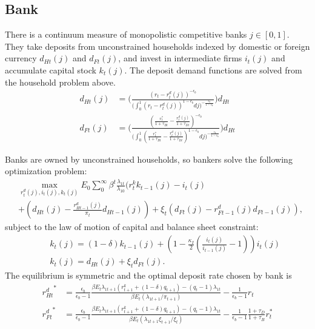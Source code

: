 \documentclass[12pt]{article}
\begin{document}
\subsection{Bank}
There is a continuum measure of monopolistic competitive banks $j \in [0,1]$. They take deposits from unconstrained households indexed by domestic or foreign currency $d_{Ht}(j)$ and $d_{Ft}(j)$, and invest in intermediate firms $i_t(j)$ and accumulate capital stock $k_t(j)$. The deposit demand functions are solved from the household problem above. 
\begin{align*}
d_{Ht}(j) &= \Biggl(\frac{(r_t-r_t^d(j))^{-\epsilon_b}}{\big(\int_0^1(r_t-r_t^d(j))^{1-\epsilon_b}dj\big)^{-\frac{\epsilon_b}{1-\epsilon_b}}}\Biggl)d_{Ht} \\
d_{Ft}(j) &= \Biggl(\frac{(\frac{r_t^*}{1+\tau_{Bt}}-\frac{r_t^d(j)}{1+\tau_{Dt}})^{-\epsilon_b}}{\big(\int_0^1(\frac{r_t^*}{1+\tau_{Bt}}-\frac{r_t^d(j)}{1+\tau_{Dt}})^{1-\epsilon_b}dj\big)^{-\frac{\epsilon_b}{1-\epsilon_b}}}\Biggl)d_{Ht}
\end{align*}

Banks are owned by unconstrained households, so bankers solve the following optimization problem: 
\begin{align*}
 &\max_{r_t^d(j),i_t(j),k_t(j)}E_0 \sum_0^{\infty}\beta^t\frac{\lambda_{1t}}{\lambda_{10}}(r_t^kk_{t-1}(j)-i_t(j) \\
 &+(d_{Ht}(j)-\frac{r_{Ht-1}^d(j)}{\pi_t}d_{Ht-1}(j))+\xi_t(d_{Ft}(j)-r_{Ft-1}^d(j)d_{Ft-1}(j)),
 \end{align*}
subject to the law of motion of capital and balance sheet constraint: 
 \begin{align*}
  \quad & k_t(j) = (1-\delta)k_{t-1}(j)+(1-\frac{\kappa_I}{2}(\frac{i_t(j)}{i_{t-1}(j)}-1))i_t(j) \\
& k_t(j) = d_{Ht}(j)+\xi_td_{Ft}(j).
\end{align*}
The equilibrium is symmetric and the optimal deposit rate chosen by bank is 
\begin{align*}
{r_{Ht}^d}^* &= \frac{\epsilon_b}{\epsilon_b-1}\frac{\beta E_t \lambda_{1t+1}(r_{t+1}^k+(1-\delta)q_{t+1})-(q_t-1)\lambda_{1t}}{\beta E_t (\lambda_{1t+1}/\pi_{t+1})}-\frac{1}{\epsilon_b-1}r_t \\
{r_{Ft}^d}^* &= \frac{\epsilon_b}{\epsilon_b-1}\frac{\beta E_t \lambda_{1t+1}(r_{t+1}^k+(1-\delta)q_{t+1})-(q_t-1)\lambda_{1t}}{\beta E_t (\lambda_{1t+1}\xi_{t+1}/\xi_t)}-\frac{1}{\epsilon_b-1}\frac{1+\tau_D}{1+\tau_B}r_t^*
\end{align*}
\end{document}

